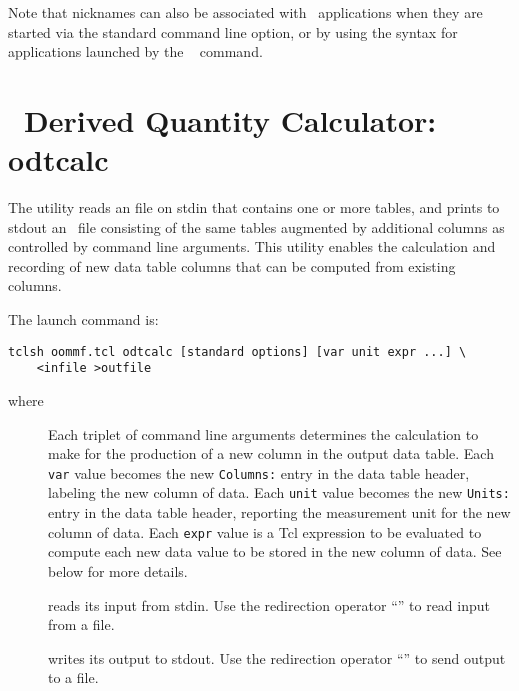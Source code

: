 Note that nicknames can also be associated with \OOMMF\ applications
when they are started via the standard  command line
option, or by using the  syntax for
applications launched by the \MIF\  command.


\section{\ODT\ Derived Quantity Calculator: odtcalc}\label{sec:odtcalc}%

The  utility reads an
 file on stdin
that contains one or more tables, and prints to stdout an \ODT\ file
consisting of the same tables augmented by additional columns as
controlled by command line arguments.  This utility enables the calculation
and recording of new data table columns that can be computed from
existing columns.

The  launch command is:
\begin{verbatim}
tclsh oommf.tcl odtcalc [standard options] [var unit expr ...] \
    <infile >outfile
\end{verbatim}
where
\begin{description}
\item[]
  Each triplet of command line arguments determines the calculation
  to make for the production of a new column in the output data table.
  Each {\tt var} value becomes the new {\tt Columns:} entry in the
  data table header, labeling the new column of data.
  Each {\tt unit} value becomes the new {\tt Units:} entry in the
  data table header, reporting the measurement unit for the new
  column of data.
  Each {\tt expr} value is a Tcl expression to be evaluated to
  compute each new data value to be stored in the new column of data.
  See below for more details.
\item[]
   reads its input from stdin.  Use the redirection operator
  ``\boa'' to read input from a file.
\item[]
   writes its output to stdout.  Use the redirection operator
  ``\bca'' to send output to a file.
\end{description}

